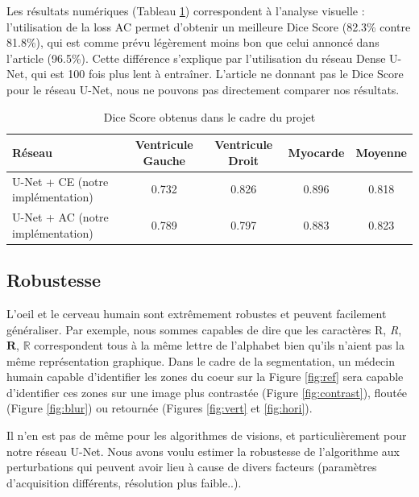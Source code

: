 \documentclass{article}
\begin{document}
Les résultats numériques (Tableau \ref{tab:res}) correspondent à l'analyse visuelle : l'utilisation de la loss AC permet d'obtenir un meilleure Dice Score (82.3\% contre 81.8\%), qui est comme prévu légèrement moins bon que celui annoncé dans l'article (96.5\%). Cette différence s'explique par l'utilisation du réseau Dense U-Net, qui est 100 fois plus lent à entraîner. L'article ne donnant pas le Dice Score pour le réseau U-Net, nous ne pouvons pas directement comparer nos résultats. 

\begin{table}[!h]
\centering
\begin{tabular}{|l||c|c|c||c|}
\hline
Réseau & Ventricule Gauche & Ventricule Droit & Myocarde & Moyenne \\\hline\hline
U-Net + CE (notre implémentation) & 0.732 & 0.826 & 0.896 & 0.818  \\
U-Net + AC (notre implémentation)  & 0.789 & 0.797 & 0.883 & 0.823 \\
\hline
\end{tabular}
\caption{\label{tab:res} Dice Score obtenus dans le cadre du projet}
\end{table}


\subsection{Robustesse}

L'oeil et le cerveau humain sont extrêmement robustes et peuvent facilement généraliser. Par exemple, nous sommes capables de dire que les caractères R, \textit{R}, $\mathbf{R}$, $\mathbb{R}$ correspondent tous à la même lettre de l'alphabet bien qu'ils n'aient pas la même représentation graphique. Dans le cadre de la segmentation, un médecin humain capable d'identifier les zones du coeur sur la Figure \ref{fig:ref} sera capable d'identifier ces zones sur une image plus contrastée (Figure \ref{fig:contrast}), floutée (Figure \ref{fig:blur}) ou retournée (Figures \ref{fig:vert} et \ref{fig:hori}).

Il n'en est pas de même pour les algorithmes de visions, et particulièrement pour notre réseau U-Net. Nous avons voulu estimer la robustesse de l'algorithme aux perturbations qui peuvent avoir lieu à cause de divers facteurs (paramètres d'acquisition différents, résolution plus faible..). 
\end{document}
